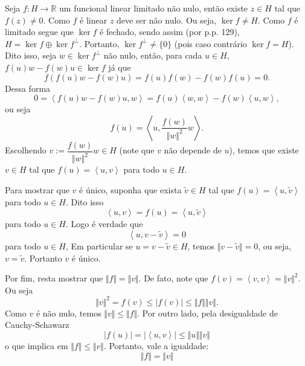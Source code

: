 \documentclass[a4paper, 11pt]{book}
\theoremstyle{definition}
\newcommand{\bR}{\mathbb{R}}
\begin{document}
\begin{prf}
    Seja $f : H \to \bR$ um funcional linear limitado não nulo, então existe $z \in H$ tal que $f(z) \neq 0$. 
    Como $f$ é linear $z$ deve ser não nulo. Ou seja, $\ker f \neq H$.
    Como $f$ é limitado segue que $\ker f$ é fechado, sendo assim (por \cite{cesar-analise.funcional} p.p. 129), $H = \ker f \oplus \ker f ^\perp$.
    Portanto, $\ker f ^\perp \neq \{0\}$ (pois caso contrário $\ker f = H$).
    Dito isso, seja $w \in \ker f ^\perp$ não nulo, então, para cada $u \in H$, $f(u) w - f(w)u \in \ker f$ já que
    \[
        f(f(u)w - f(w)u) = f(u) f(w) - f(w)f(u) = 0.
    \]
    Dessa forma
    \[
        0 = \left\langle f(u)w - f(w)u, w \right\rangle = f(u) \left\langle w,w \right\rangle - f(w) \left\langle u,w \right\rangle,
    \]
    ou seja
    \[
        f(u) = \left\langle u, \frac{f(w)}{\Vert w \Vert^2}w \right\rangle.
    \]
    Escolhendo $v := \dfrac{f(w)}{\Vert w \Vert^2} w \in H$ (note que $v$ não depende de $u$), temos que existe $v \in H$ tal que $f(u) = \left\langle u,v \right\rangle$ para todo $u \in H$.

    Para mostrar que $v$ é único, suponha que exista $\tilde v \in H$ tal que $f(u) = \left\langle u, \tilde v \right\rangle$ para todo $u \in H$.
    Dito isso
    \[
        \left\langle u, v \right\rangle = f(u) = \left\langle u,\tilde v \right\rangle
    \] 
    para todo $u \in H$. Logo é verdade que
    \[
        \left\langle u , v - \tilde v \right\rangle = 0
    \]
    para todo $u \in H$, Em particular se $u = v - \tilde v \in H$, temos $\Vert v - \tilde v \Vert = 0$, ou seja, $v = \tilde v$. Portanto $v$ é único.

    Por fim, resta mostrar que $\Vert f \Vert = \Vert v \Vert$.
    De fato, note que $f(v) = \left\langle v, v \right\rangle = \Vert v \Vert^2$. Ou seja
    \[
        \Vert v \Vert^2 = f(v) \leqslant |f(v)| \leqslant \Vert f \Vert \Vert v \Vert.
    \]
    Como $v$ é não nulo, temos $\Vert v \Vert \leqslant \Vert f \Vert$.
    Por outro lado, pela desigualdade de Cauchy-Schawarz
    \[
        |f(u)| = |\left\langle u,v \right\rangle| \leqslant \Vert u \Vert \Vert v \Vert
    \]
    o que implica em $\Vert f \Vert \leqslant \Vert v \Vert$.
    Portanto, vale a igualdade:
    \[
        \Vert f \Vert = \Vert v \Vert
    \]
\end{prf}
\end{document}

